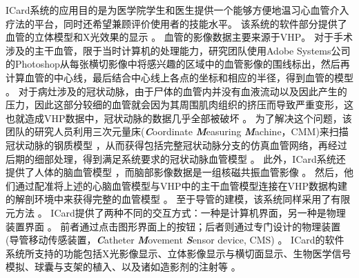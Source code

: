 ICard系统的应用目的是为医学院学生和医生提供一个能够方便地温习心血管介入疗法的平台，同时还希望兼顾评价使用者的技能水平。
该系统的软件部分提供了血管的立体模型和X光效果的显示 \cite{Wang1998ICard,Wang1998aICard}。
血管的影像数据主要来源于VHP。
对于手术涉及的主干血管，限于当时计算机的处理能力，研究团队使用Adobe Systems公司的Photoshop从每张横切影像中将感兴趣的区域中的血管影像的围线标出，然后再计算血管的中心线，最后结合中心线上各点的坐标和相应的半径，得到血管的模型 \cite{Wang1998ICard}。%
对于病灶涉及的冠状动脉，由于尸体的血管内并没有血液流动以及因此产生的压力，因此这部分较细的血管就会因为其周围肌肉组织的挤压而导致严重变形，这也就造成VHP数据中，冠状动脉的数据几乎全部被破坏 \cite{Wang1998ICard}。%
为了解决这个问题，该团队的研究人员利用三次元量床(\textbf{\textit{C}}oordinate \textbf{\textit{M}}easuring \textbf{\textit{M}}achine，CMM)\cite{CMMweb}来扫描冠状动脉的钢质模型 \cite{KyotoModelweb}，从而获得包括完整冠状动脉分支的仿真血管网络，再经过后期的细部处理，得到满足系统要求的冠状动脉血管模型 \cite{Wang1998ICard}。%
此外，ICard系统还提供了人体的脑血管模型 \cite{Serra1997Vessel,Poston1995Vessel}，而脑部影像数据是一组核磁共振血管影像 \cite{Wang1998ICard}。
然后，他们通过配准将上述的心脑血管模型与VHP中的主干血管模型连接在VHP数据构建的解剖环境中来获得完整的血管模型 \cite{Wang1998ICard}。
至于导管的建模，该系统同样采用了有限元方法 \cite{Wang1998ICard}。
ICard提供了两种不同的交互方式：一种是计算机界面，另一种是物理装置界面 \cite{Wang1998ICard}。
前者通过点击图形界面上的按钮；后者则通过专门设计的物理装置(导管移动传感装置，\textbf{\textit{C}}atheter \textbf{\textit{M}}ovement \textbf{\textit{S}}ensor device, CMS) \cite{Lim1998ICard,Lim1997ICard}。%
ICard的软件系统所支持的功能包括X光影像显示、立体影像显示与横切面显示、生物医学信号模拟、球囊与支架的植入、以及诸如造影剂的注射等 \cite{Wang1998ICard}。

